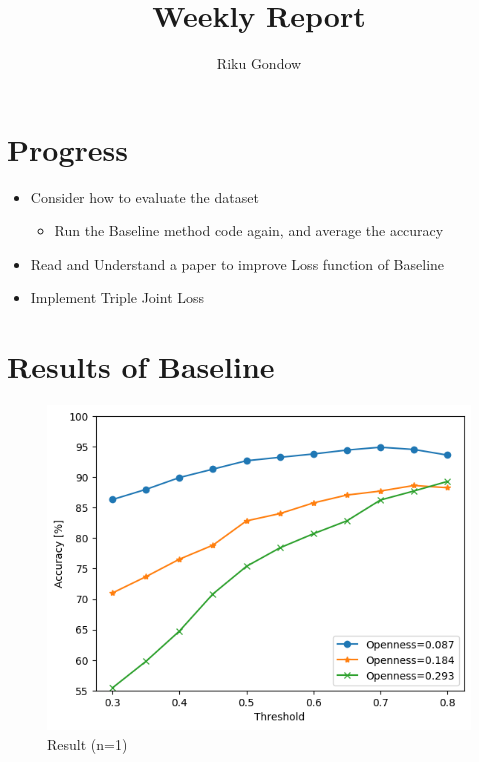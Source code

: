 \documentclass[dvipdfmx]{article}
\begin{document}
\title{Weekly Report}
\author{Riku Gondow}
\maketitle
\section{Progress}
\begin{itemize}
    \item Consider how to evaluate the dataset
    \begin{itemize}
        \item Run the Baseline method code again, and average the accuracy
    \end{itemize}
    \item Read and Understand a paper to improve Loss function of Baseline
    \item Implement Triple Joint Loss\cite{tripleloss}
\end{itemize}

\section{Results of Baseline}
\begin{figure}[H]
\begin{center}
\includegraphics[width=0.8\linewidth]{./img/openset_graph.png}
\end{center}
\caption{Result (n=1)}
\end{figure}
\end{document}
